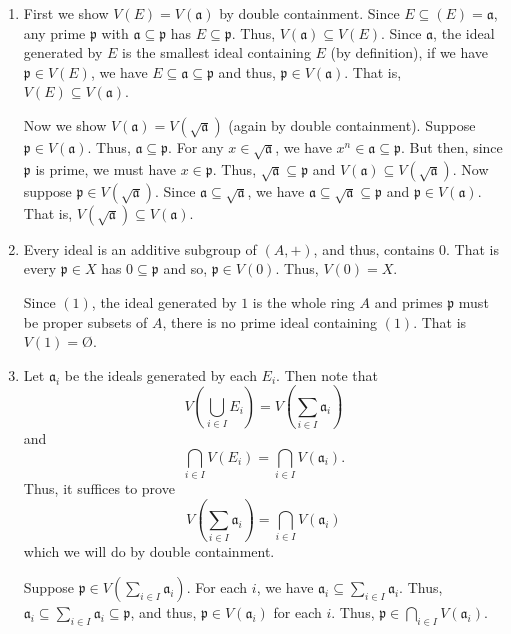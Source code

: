 \documentclass[12 pt, letterpaper]{hmcpset}
\begin{document}
\begin{solution}
	\begin{enumerate}
		\item First we show $V(E) = V(\mathfrak{a})$ by double containment. Since $E \subseteq (E) = \mathfrak{a}$, any prime $\mathfrak{p}$ with $\mathfrak{a} \subseteq \mathfrak{p}$ has $E \subseteq \mathfrak{p}$. Thus, $V(\mathfrak{a}) \subseteq V(E)$. Since $\mathfrak{a}$, the ideal generated by $E$ is the smallest ideal containing $E$ (by definition), if we have $\mathfrak{p} \in V(E)$, we have $E \subseteq \mathfrak{a} \subseteq \mathfrak{p}$ and thus, $\mathfrak{p} \in V(\mathfrak{a})$. That is, $V(E) \subseteq V(\mathfrak{a})$.

			Now we show $V(\mathfrak{a}) = V(\sqrt{\mathfrak{a}})$ (again by double containment). Suppose $\mathfrak{p} \in V(\mathfrak{a})$. Thus, $\mathfrak{a} \subseteq \mathfrak{p}$. For any $x \in \sqrt{\mathfrak{a}}$, we have $x^{n} \in \mathfrak{a} \subseteq \mathfrak{p}$. But then, since $\mathfrak{p}$ is prime, we must have $x \in \mathfrak{p}$. Thus, $\sqrt{\mathfrak{a}} \subseteq \mathfrak{p}$ and $V(\mathfrak{a}) \subseteq V(\sqrt{\mathfrak{a}})$. Now suppose $\mathfrak{p} \in V(\sqrt{\mathfrak{a}})$. Since $\mathfrak{a} \subseteq \sqrt{\mathfrak{a}}$, we have $\mathfrak{a} \subseteq \sqrt{\mathfrak{a}} \subseteq \mathfrak{p}$ and $\mathfrak{p} \in V(\mathfrak{a})$. That is, $V(\sqrt{\mathfrak{a}}) \subseteq V(\mathfrak{a})$.

		\item Every ideal is an additive subgroup of $(A, +)$, and thus, contains $0$. That is every $\mathfrak{p} \in X$ has $0 \subseteq \mathfrak{p}$ and so, $\mathfrak{p} \in V(0)$. Thus, $V(0) = X$.

			Since $(1)$, the ideal generated by $1$ is the whole ring $A$ and primes $\mathfrak{p}$ must be proper subsets of $A$, there is no prime ideal containing $(1)$. That is $V(1) = \text{\O}$.

		\item Let $\mathfrak{a}_{i}$ be the ideals generated by each $E_{i}$. Then note that
			\[
				V\left ( \bigcup_{i \in I} E_{i} \right ) = V\left ( \sum_{i \in I} \mathfrak{a}_{i} \right )
			\]
			and
			\[
				\bigcap_{i \in I} V(E_{i}) = \bigcap_{i \in I} V(\mathfrak{a}_{i}).
			\]
			Thus, it suffices to prove
			\[
				V \left ( \sum_{i \in I} \mathfrak{a}_{i} \right ) = \bigcap_{i \in I} V(\mathfrak{a}_{i})
			\]
			which we will do by double containment.

			Suppose $\mathfrak{p} \in V(\sum_{i \in I} \mathfrak{a}_{i})$. For each $i$, we have $\mathfrak{a}_{i} \subseteq \sum_{i \in I} \mathfrak{a}_{i}$. Thus, $\mathfrak{a}_{i} \subseteq \sum_{i \in I} \mathfrak{a}_{i} \subseteq \mathfrak{p}$, and thus, $\mathfrak{p} \in V(\mathfrak{a}_{i})$ for each $i$. Thus, $\mathfrak{p} \in \bigcap_{i \in I} V(\mathfrak{a}_{i})$. 


\end{enumerate}
\end{solution}
\end{document}
